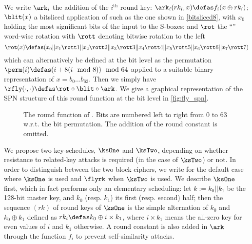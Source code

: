 We write $\ark_i$ the addition of the $i^\text{th}$ round key: $\ark_i(rk_i, x) \defas f_i(x \oplus rk_i)$;
$\blit(x)$ a bitsliced application of
\littlunOne such as \eg the one shown in \autoref{bitsliced8}, with $x_0$ holding the most significant bits of the input to the S-boxes;
and $\rot$ the ``\shiftrow'' word-wise rotation with $\rott$ denoting bitwise rotation to the left
\[
\rot(x) \defas (x_0||x_1 \rott 1||x_2 \rott 2||x_3 \rott 3||x_4 \rott 4||x_5 \rott 5||x_6 \rott 6||x_7 \rott 7)
\]
which can alternatively be defined at the bit level as the permutation $\perm(i) \defas (i + 8(i \mod 8)) \mod 64$
applied to a suitable binary representation of $x = b_0\ldots b_{63}$. Then we simply have
$\rfly(\cdot,\cdot) \defas \rot \circ \blit \circ \ark$.
We give a graphical representation of the SPN structure of this round function at the bit level in \autoref{fig:fly_spn}.

\begin{figure}[ht]
\centering

\caption[The round function of \fly.]{The round function of \fly.\label{fig:fly_spn} Bits are numbered left to right from 0 to 63 w.r.t. the bit permutation. The addition of the round constant is
omitted.}
\end{figure}

\medskip


We propose two key-schedules, $\ksOne$ and $\ksTwo$, depending on whether resistance to related-key attacks is required (in the case of $\ksTwo$) or not.
In order to distinguish between the two block ciphers, we write \fly for the default case where $\ksOne$ is used and $\flyrk$ when $\ksTwo$ is used.
We describe $\ksOne$ first, which in fact performs only an elementary scheduling:
let $k := k_0||k_1$ be the 128-bit master key, and $k_0$ (resp. $k_1$) its first (resp. second) half; then 
the sequence $(rk)$ of round keys of $\ksOne$ is the simple alternation of $k_0$ and $k_0 \oplus k_1$ defined as $rk_i \defas k_0 \oplus i\times k_1$, where
$i\times k_1$
means the all-zero key for even values of $i$ and $k_1$ otherwise.
A round constant is also added in $\ark$ through the function $f_i$ to prevent self-similarity attacks.

